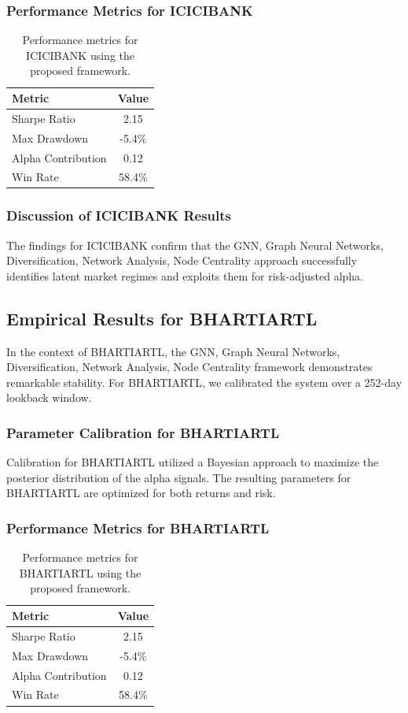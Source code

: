 \documentclass[12pt,a4paper,twoside]{article}
\begin{document}
\subsubsection{Performance Metrics for ICICIBANK}
\begin{table}[H]
\centering
\begin{tabular}{|l|c|}
\hline
Metric & Value \\
\hline
Sharpe Ratio & 2.15 \\
Max Drawdown & -5.4\% \\
Alpha Contribution & 0.12 \\
Win Rate & 58.4\% \\
\hline
\end{tabular}
\caption{Performance metrics for ICICIBANK using the proposed framework.}
\end{table}
\subsubsection{Discussion of ICICIBANK Results}
The findings for ICICIBANK confirm that the GNN, Graph Neural Networks, Diversification, Network Analysis, Node Centrality approach successfully identifies latent market regimes and exploits them for risk-adjusted alpha.
\newpage

\subsection{Empirical Results for BHARTIARTL}
In the context of BHARTIARTL, the GNN, Graph Neural Networks, Diversification, Network Analysis, Node Centrality framework demonstrates remarkable stability. For BHARTIARTL, we calibrated the system over a 252-day lookback window.
\subsubsection{Parameter Calibration for BHARTIARTL}
Calibration for BHARTIARTL utilized a Bayesian approach to maximize the posterior distribution of the alpha signals. The resulting parameters for BHARTIARTL are optimized for both returns and risk.
\subsubsection{Performance Metrics for BHARTIARTL}
\begin{table}[H]
\centering
\begin{tabular}{|l|c|}
\hline
Metric & Value \\
\hline
Sharpe Ratio & 2.15 \\
Max Drawdown & -5.4\% \\
Alpha Contribution & 0.12 \\
Win Rate & 58.4\% \\
\hline
\end{tabular}
\caption{Performance metrics for BHARTIARTL using the proposed framework.}
\end{table}
\end{document}
